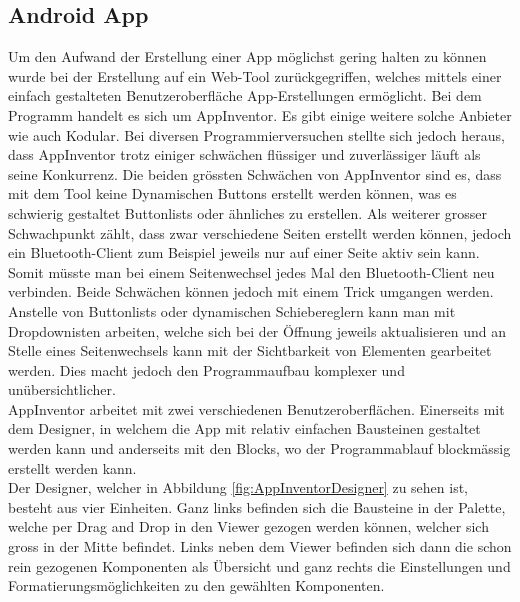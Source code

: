 \subsection{Android App}
\label{subsec:Software_App}

Um den Aufwand der Erstellung einer App möglichst gering halten zu können wurde bei der Erstellung auf ein Web-Tool zurückgegriffen, welches mittels einer einfach gestalteten Benutzeroberfläche App-Erstellungen ermöglicht. Bei dem Programm handelt es sich um AppInventor. Es gibt einige weitere solche Anbieter wie auch Kodular. Bei diversen Programmierversuchen stellte sich jedoch heraus, dass AppInventor trotz einiger schwächen flüssiger und zuverlässiger läuft als seine Konkurrenz.  Die beiden grössten Schwächen von AppInventor sind es, dass mit dem Tool keine Dynamischen Buttons erstellt werden können, was es schwierig gestaltet Buttonlists oder ähnliches zu erstellen. Als weiterer grosser Schwachpunkt zählt, dass zwar verschiedene Seiten erstellt werden können, jedoch ein Bluetooth-Client zum Beispiel jeweils nur auf einer Seite aktiv sein kann. Somit müsste man bei einem Seitenwechsel jedes Mal den Bluetooth-Client neu verbinden. Beide Schwächen können jedoch mit einem Trick umgangen werden. Anstelle von Buttonlists oder dynamischen Schiebereglern kann man mit Dropdownisten arbeiten, welche sich bei der Öffnung jeweils aktualisieren und an Stelle eines Seitenwechsels kann mit der Sichtbarkeit von Elementen gearbeitet werden. Dies macht jedoch den Programmaufbau komplexer und unübersichtlicher. \cite{appinventor_mit_nodate} \cite{kodular_kodular_nodate} \\


AppInventor arbeitet mit zwei verschiedenen Benutzeroberflächen. Einerseits mit dem Designer, in welchem die App mit relativ einfachen Bausteinen gestaltet werden kann und anderseits mit den Blocks, wo der Programmablauf blockmässig erstellt werden kann.\\

Der Designer, welcher in Abbildung \ref{fig:AppInventorDesigner} zu sehen ist, besteht aus vier Einheiten. Ganz links befinden sich die Bausteine in der Palette, welche per Drag and Drop in den Viewer gezogen werden können, welcher sich gross in der Mitte befindet. Links neben dem Viewer befinden sich dann die schon rein gezogenen Komponenten als Übersicht und ganz rechts die Einstellungen und Formatierungsmöglichkeiten zu den gewählten Komponenten.

\newpage

